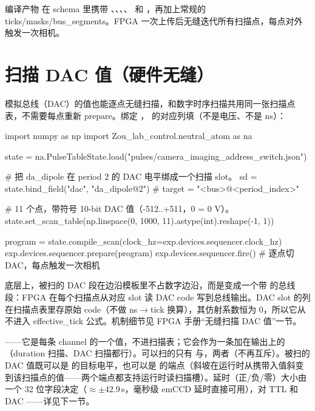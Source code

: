 \documentclass[11pt,oneside,openany]{book}
\begin{document}
编译产物  在 schema 里携带 、、、、 和 ，再加上常规的 ticks/masks/bus\_segments。FPGA 一次上传后无缝迭代所有扫描点，每点对外触发一次相机。

\section{扫描 DAC 值（硬件无缝）}
模拟总线（DAC）的值也能逐点无缝扫描，和数字时序扫描共用同一张扫描点表，不需要每点重新 prepare。绑定 ， 的对应列填（不是电压、不是 ns）：

\begin{codeblock}[Python]
import numpy as np
import Zou_lab_control.neutral_atom as na

state = na.PulseTableState.load("pulses/camera_imaging_address_switch.json")

# 把 da_dipole 在 period 2 的 DAC 电平绑成一个扫描 slot。
sd = state.bind_field("dac", "da_dipole@2")        # target = "<bus>@<period_index>"

# 11 个点，带符号 10-bit DAC 值（-512..+511，0 = 0 V）。
state.set_scan_table(np.linspace(0, 1000, 11).astype(int).reshape(-1, 1))

program = state.compile_scan(clock_hz=exp.devices.sequencer.clock_hz)
exp.devices.sequencer.prepare(program)
exp.devices.sequencer.fire()                       # 逐点切 DAC，每点触发一次相机
\end{codeblock}

底层上，被扫的 DAC 段在边沿模板里不占数字边沿，而是变成一个带  的总线段：FPGA 在每个扫描点从对应 slot 读 DAC code 写到总线输出。DAC slot 的列在扫描点表里存原始 code（不做 ns$\to$tick 换算），其仿射系数恒为 0，所以它从不进入 effective\_tick 公式。机制细节见 FPGA 手册“无缝扫描 DAC 值”一节。

\begin{notebox}[组合规则]
——它是每条 channel 的一个值，不进扫描表；它会作为一条加在输出上的（duration 扫描、DAC 扫描都行）。可以扫的只有 与，两者（不再互斥）。被扫的 DAC 值既可以是  的目标电平，也可以是  的端点（斜坡在运行时从携带入值斜变到该扫描点的值——两个端点都支持运行时读扫描槽）。延时（正/负/零）大小由一个 32 位字段决定（$\approx\pm42.9\,$s，毫秒级 emCCD 延时直接可用），对 TTL 和 DAC ——详见下一节。
\end{notebox}
\end{document}
